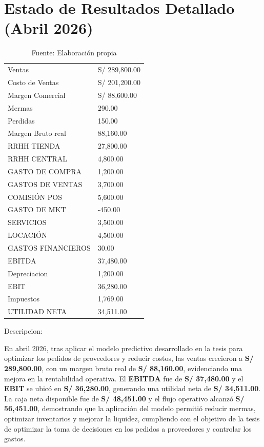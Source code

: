 \vspace{0.5cm}

\section*{Estado de Resultados Detallado (Abril 2026)}

\begin{table}[H]
\centering
\begin{tabular}{|L{6cm}|R{4cm}|}
\hline
Ventas & S/ 289,800.00 \\
Costo de Ventas & S/ 201,200.00 \\
 Margen Comercial & S/ 88,600.00 \\
Mermas & 290.00 \\
Perdidas & 150.00 \\
 Margen Bruto real & 88,160.00 \\
RRHH TIENDA & 27,800.00 \\
RRHH CENTRAL & 4,800.00 \\
GASTO DE COMPRA & 1,200.00 \\
GASTOS DE VENTAS & 3,700.00 \\
COMISIÓN POS & 5,600.00 \\
GASTO DE MKT & -450.00 \\
SERVICIOS & 3,500.00 \\
LOCACIÓN & 4,500.00 \\
GASTOS FINANCIEROS & 30.00 \\
 EBITDA & 37,480.00 \\
Depreciacion & 1,200.00 \\
EBIT & 36,280.00 \\
Impuestos & 1,769.00 \\
 UTILIDAD NETA & 34,511.00 \\ \hline
\end{tabular}
\caption{Fuente: Elaboración propia}
\end{table}

Descripcion:

En abril 2026, tras aplicar el modelo predictivo desarrollado en la tesis para optimizar los pedidos de proveedores y reducir costos, las ventas crecieron a \textbf{S/ 289,800.00}, con un margen bruto real de \textbf{S/ 88,160.00}, evidenciando una mejora en la rentabilidad operativa. El \textbf{EBITDA} fue de \textbf{S/ 37,480.00} y el \textbf{EBIT} se ubicó en \textbf{S/ 36,280.00}, generando una utilidad neta de \textbf{S/ 34,511.00}. La caja neta disponible fue de \textbf{S/ 48,451.00} y el flujo operativo alcanzó \textbf{S/ 56,451.00}, demostrando que la aplicación del modelo permitió reducir mermas, optimizar inventarios y mejorar la liquidez, cumpliendo con el objetivo de la tesis de optimizar la toma de decisiones en los pedidos a proveedores y controlar los gastos.

